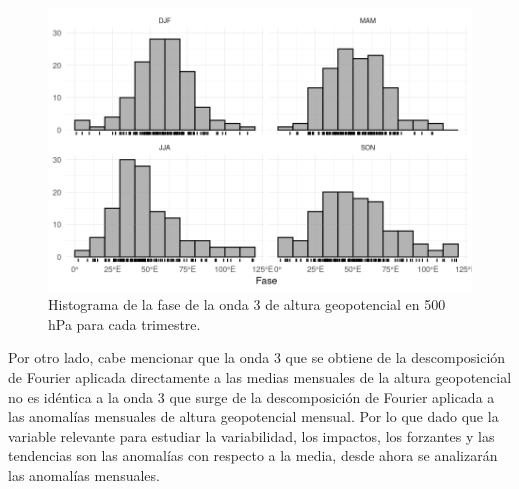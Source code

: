 \documentclass[12pt,oneside,a4paper]{reedthesis}
\begin{document}
\begin{figure}

{\centering \includegraphics{figures/15-onda3/fase-histogram-1} 

}

\caption{Histograma de la fase de la onda 3 de altura geopotencial en 500 hPa para cada trimestre.}\label{fig:fase-histogram}
\end{figure}



Por otro lado, cabe mencionar que la onda 3 que se obtiene de la descomposición de Fourier aplicada directamente a las medias mensuales de la altura geopotencial no es idéntica a la onda 3 que surge de la descomposición de Fourier aplicada a las anomalías mensuales de altura geopotencial mensual.
Por lo que dado que la variable relevante para estudiar la variabilidad, los impactos, los forzantes y las tendencias son las anomalías con respecto a la media, desde ahora se analizarán las anomalías mensuales.
\end{document}
